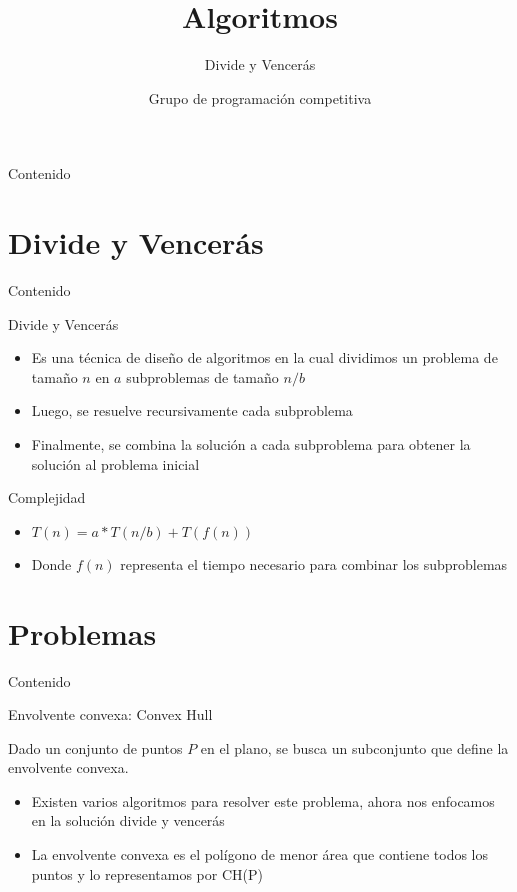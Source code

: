\documentclass[]{beamer}
\title{Algoritmos}
\subtitle{Divide y Vencer\'as}
\author{Grupo de programaci\'on competitiva}
\institute{Campamento de Programaci\'on}
\date{}
\begin{document}
\maketitle

\begin{frame}{Contenido}
\tableofcontents
\end{frame}

\section{Divide y Vencer\'as}
\begin{frame}{Contenido}
\tableofcontents[currentsection]
\end{frame}

\begin{frame}{Divide y Vencer\'as}
  \begin{itemize}
    \item Es una t\'ecnica de dise\~no de algoritmos en la cual dividimos un problema de tama\~no $n$ en $a$ subproblemas de tama\~no $n/b$
      \pause
    \item Luego, se resuelve recursivamente cada subproblema
      \pause
    \item Finalmente, se combina la soluci\'on a cada subproblema para obtener la soluci\'on al problema inicial
  \end{itemize}
\end{frame}

\begin{frame}{Complejidad}
  \begin{itemize}
    \item $T(n) = a*T(n/b) + T(f(n))$
      \pause
    \item Donde $f(n)$ representa el tiempo necesario para combinar los subproblemas
  \end{itemize}
\end{frame}

\section{Problemas}
\begin{frame}{Contenido}
\tableofcontents[currentsection]
\end{frame}

\begin{frame}{Envolvente convexa: Convex Hull}
  \begin{definition}
    Dado un conjunto de puntos $P$ en el plano, se busca un subconjunto que define la envolvente convexa.
  \end{definition}
  \pause
  \begin{itemize}
    \item Existen varios algoritmos para resolver este problema, ahora nos enfocamos en la soluci\'on divide y vencer\'as
      \pause
    \item La envolvente convexa es el pol\'igono de menor \'area que contiene todos los puntos y lo representamos por CH(P)
  \end{itemize}
\end{frame}
\end{document}
